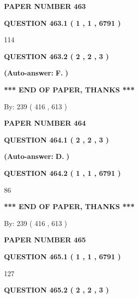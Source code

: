 \documentclass{ctexart}
\begin{document}
   
\newpage 
\setcounter{page}{ 
   463001 } 
   
   
 {\textbf{ \Large{ PAPER NUMBER  463  }}}
   
   
   
   
  
  
{\textbf{\large{QUESTION
463.1 
 ( 1 , 1 , 6791 )
}}}

114
  
  
{\textbf{\large{QUESTION
463.2 
 ( 2 , 2 , 3 )
}}}
 
 
{\textbf{(Auto-answer:}}
{\textbf{\large{
F.}}}
{\textbf{)}}
 
 
   
   
   
   
\vspace{1.0in} 
{\textbf{\large{ *** END OF PAPER, THANKS *** }}} 
   
   
\hspace{1.0in} By: 
 239 ( 416 ,  613 )
   
   
   
   
\newpage 
\setcounter{page}{ 
   464001 } 
   
   
 {\textbf{ \Large{ PAPER NUMBER  464  }}}
   
   
   
   
  
  
{\textbf{\large{QUESTION
464.1 
 ( 2 , 2 , 3 )
}}}
 
 
{\textbf{(Auto-answer:}}
{\textbf{\large{
D.}}}
{\textbf{)}}
 
 
  
  
{\textbf{\large{QUESTION
464.2 
 ( 1 , 1 , 6791 )
}}}

86
   
   
   
   
\vspace{1.0in} 
{\textbf{\large{ *** END OF PAPER, THANKS *** }}} 
   
   
\hspace{1.0in} By: 
 239 ( 416 ,  613 )
   
   
   
   
\newpage 
\setcounter{page}{ 
   465001 } 
   
   
 {\textbf{ \Large{ PAPER NUMBER  465  }}}
   
   
   
   
  
  
{\textbf{\large{QUESTION
465.1 
 ( 1 , 1 , 6791 )
}}}

127
  
  
{\textbf{\large{QUESTION
465.2 
 ( 2 , 2 , 3 )
}}}
 
\end{document}

